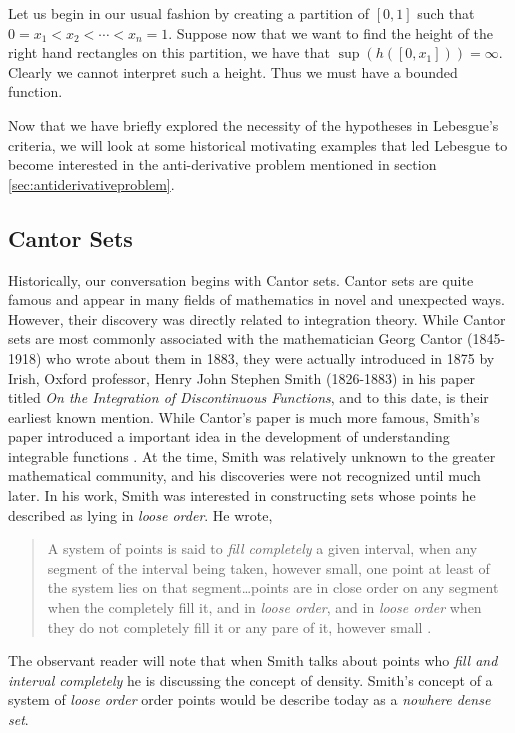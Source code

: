 \documentclass{article}
\theoremstyle{axiom} \newtheorem{axiom}{Axiom}
\theoremstyle{definition} \newtheorem{definition}{Definition}
\theoremstyle{example} \newtheorem{example}{Example}
\theoremstyle{proposition} \newtheorem{prop}{Proposition}
\theoremstyle{lemma} \newtheorem{lemma}{Lemma}
\begin{document}
Let us begin in our usual fashion by creating a partition of $[0,1]$ such that
$0 = x_1 < x_2 < \cdots < x_n = 1$. Suppose now that we want to find the height
of the right hand rectangles on this partition, we have that $\sup(h([0,x_1])) =
\infty$. Clearly we cannot interpret such a height. Thus we must have a bounded
function.

Now that we have briefly explored the necessity of the hypotheses in Lebesgue's
criteria, we will look at some historical motivating examples that led 
Lebesgue to become interested in the anti-derivative problem mentioned in
section \ref{sec:antiderivativeproblem}.

\subsection{Cantor Sets}

Historically, our conversation begins with Cantor sets. Cantor sets are
quite famous and appear in many fields of mathematics in novel and unexpected ways.
However, their discovery was directly related to  integration theory. 
While Cantor sets are most commonly associated with the mathematician Georg 
Cantor (1845-1918) who wrote about them in 1883, they were 
actually introduced in 1875 by Irish, Oxford professor, Henry John Stephen 
Smith (1826-1883) in his paper titled \textit{On the Integration of 
Discontinuous Functions}, and to this date, is
their earliest known mention. While Cantor's paper is much more famous, Smith's 
paper introduced a important idea in the development of understanding integrable 
functions \cite{scoville:2019}. At the time, Smith was relatively unknown
to the greater mathematical community, and his discoveries were not recognized 
until much later. In his work, Smith was interested in constructing sets whose points
he described as lying in \textit{loose order}. He wrote,
\begin{quote}
	A system of points is said to \textit{fill completely} a given interval, when any
	segment of the interval being taken, however small, one point at least of
	the system lies on that segment\ldots points are in close order on any
	segment when the completely fill it, and in \textit{loose order}, and
	in \textit{loose order} when they do not completely fill it or any pare of
	it, however small \cite{smith:1875}.
\end{quote}
The observant reader will note that when Smith talks about points who
\textit{fill and interval completely} he is discussing the concept of density.
Smith's concept of a system of \textit{loose order} order
points would be describe today as a \textit{nowhere dense set}.
\end{document}

